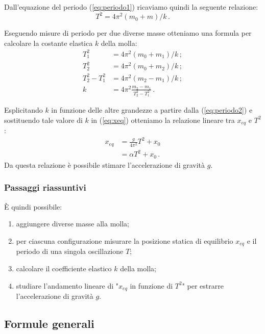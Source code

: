 \documentclass[titlepage]{article}
\numberwithin{equation}{section}
\numberwithin{figure}{section}
\numberwithin{table}{section}
\begin{document}
Dall'equazione del periodo (\ref{eq:periodo1}) ricaviamo quindi la seguente relazione:
\begin{equation}
  \label{eq:periodo2}
  T^2 = 4 \pi^2 (m_0 + m) / k \,.
\end{equation}

Eseguendo misure di periodo per due diverse masse otteniamo una formula per calcolare la costante elastica $k$ della molla:
\begin{align}
  T^2_1 &= 4 \pi^2 (m_0 + m_1) / k \,; \nonumber \\
  T^2_2 &= 4 \pi^2 (m_0 + m_2) / k \,; \nonumber \\
  T^2_2 - T^2_1 &= 4 \pi^2 (m_2 - m_1) / k \,; \nonumber \\
  k &= 4 \pi^2 \frac{m_2 - m_1}{T^2_2 - T^2_1} \,. \label{eq:k}
\end{align}

Esplicitando $k$ in funzione delle altre grandezze a partire dalla (\ref{eq:periodo2}) e sostituendo tale valore di $k$ in (\ref{eq:xeq}) otteniamo la relazione lineare tra $x_{eq}$ e $T^2$:
\begin{align}
  x_{eq} &= \frac{g}{4 \pi^2} T^2 + x_0 \nonumber \\
  &= \alpha T^2 + x_0 \,. \label{eq:xeqLineare}
\end{align}
Da questa relazione è possibile stimare l'accelerazione di gravità $g$.

\subsubsection{Passaggi riassuntivi}

È quindi possibile:
\begin{enumerate}
  \item aggiungere diverse masse alla molla;
  \item per ciascuna configurazione misurare la posizione statica di equilibrio $x_{eq}$ e il periodo di una singola oscillazione $T$;
  \item calcolare il coefficiente elastico $k$ della molla;
  \item studiare l'andamento lineare di "$x_{eq}$ in funzione di $T^2$" per estrarre l'accelerazione di gravità $g$.
\end{enumerate}

\subsection{Formule generali}
\end{document}
